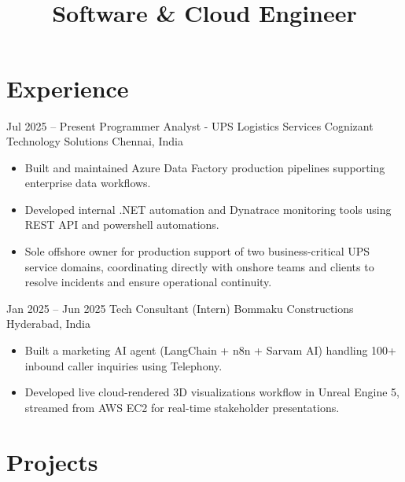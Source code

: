 \documentclass[10pt, a4paper, sans]{moderncv}
\title{\\[2mm] Software \& Cloud Engineer}
\begin{document}

\makecvtitle
\vspace*{-8mm}

\section{Experience}

\cventry
  {Jul 2025 -- Present}
  {Programmer Analyst - UPS Logistics Services}
  {Cognizant Technology Solutions}
  {Chennai, India}
  {}
  {
  \begin{itemize}\setlength{\itemsep}{2pt}
    \item Built and maintained Azure Data Factory production pipelines supporting enterprise data workflows.
    \item Developed internal .NET automation and Dynatrace monitoring tools using REST API and powershell automations.
    \item Sole offshore owner for production support of two business-critical UPS service domains, coordinating directly with onshore teams and clients to resolve incidents and ensure operational continuity.
  \end{itemize}
  }

\vspace{1mm}

\cventry
  {Jan 2025 -- Jun 2025}
  {Tech Consultant (Intern)}
  {Bommaku Constructions}
  {Hyderabad, India}
  {}
  {
  \begin{itemize}\setlength{\itemsep}{2pt}
    \item Built a marketing AI agent (LangChain + n8n + Sarvam AI) handling 100+ inbound caller inquiries using Telephony.
    \item Developed live cloud-rendered 3D visualizations workflow in Unreal Engine 5, streamed from AWS EC2 for real-time stakeholder presentations.
  \end{itemize}
  }

\section{Projects}
\end{document}
